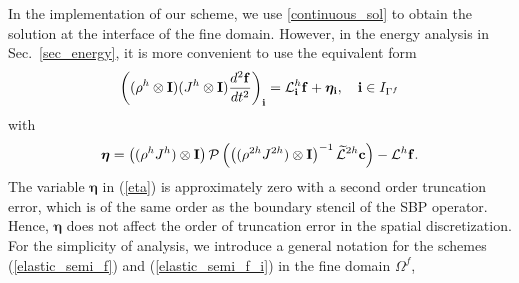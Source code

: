 {{In the implementation of our scheme, we use \eqref{continuous_sol} to obtain the solution at the interface of the fine domain. However, in the energy analysis in  Sec.~\ref{sec_energy}, it is more convenient to use the equivalent form
\begin{equation}\label{elastic_semi_f_i}
\left(({\rho}^h\otimes{\bf I})(J^h\otimes{\bf I}) \frac{d^2{\bf f}}{dt^2} \right)_{\bf i}=
\mathcal{L}^h_{\bf i}{\bf f} + {\bm \eta}_{\bf i}, \quad {\bf i}\in I_{\Gamma^f}
\end{equation}
with 
\begin{equation}\label{eta}
{\bm \eta} = \left(({\rho}^hJ^h)\otimes{\bf I}\right){\mathcal{P}}\left(\left(({\rho^{2h}J^{2h}})\otimes{\bf I}\right)^{-1}\wt{\mathcal{L}}^{2h} {\bf c}\right) - \mathcal{L}^{h}{\bf f}.
\end{equation}
The variable $\bm \eta$ in (\ref{eta}) is approximately zero with a second order truncation error, which is of the same order as the boundary stencil of the SBP operator. Hence,  $\bm \eta$ does not affect the order of truncation error in the spatial discretization. %
For the simplicity of analysis, we introduce a general notation for the schemes (\ref{elastic_semi_f}) and (\ref{elastic_semi_f_i}) in the fine domain $\Omega^f$,
}}
